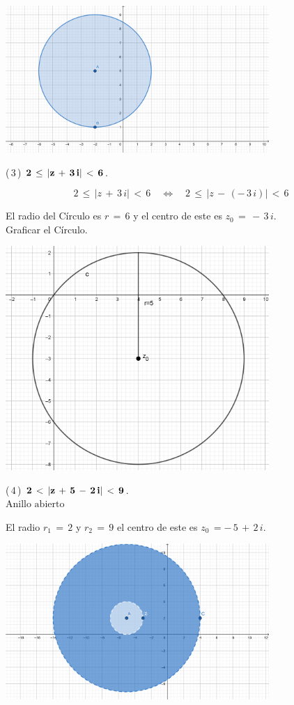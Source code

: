 \documentclass[a4paper,11pt,openany]{book}
\begin{document}
\begin{center}
    \includegraphics[width=10cm]{Gra-Ej-2.png}
\end{center}

\textcolor{ao(english)}{(\,3\,)} $\bf{2\,\leq\,|z\,+\,3\,i|\,<\,6}$.

$$2\,\leq\,|z\,+\,3\,i|\,<\,6 \quad\iff\quad 2\,\leq\,|z\,-\,(-\,3\,i)|\,<\,6$$

El radio del Círculo es $r\,=\,6$ y el centro de este es $z_{0}\,=\,-\,3\,i$.\\

\textcolor{ao(english)}{} Graficar el Círculo.

\begin{center}
     \includegraphics[width=10cm]{Gra-Ej-1.png}
\end{center}

\textcolor{ao(english)}{(\,4\,)} $\bf{2\,<\,|z\,+\,5\,-\,2\,i|\,<\,9}$.\\
$\text{Anillo abierto}$

El radio $r_{1}\,=\,2$ y $r_{2}\,=\,9$ el centro de este es $z_{0}\,=-\,5\,+\,2\,i$.\\

\begin{center}
    \includegraphics[width=10cm]{Gra-Ej-4.png}
\end{center}
\end{document}
